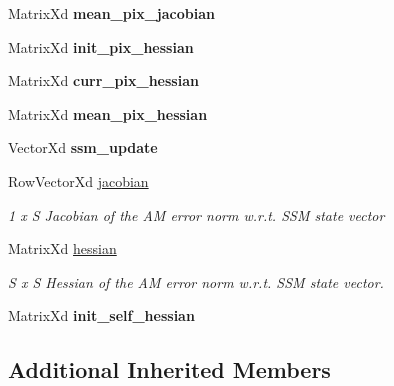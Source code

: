 \begin{DoxyCompactItemize}
\item 
\hypertarget{classESMH_a2d91cb739ee987432da7e95dea5b13ae}{Matrix\-Xd {\bfseries mean\-\_\-pix\-\_\-jacobian}}\label{classESMH_a2d91cb739ee987432da7e95dea5b13ae}

\item 
\hypertarget{classESMH_a4bb14113f170c065e182d84c6bfff9fe}{Matrix\-Xd {\bfseries init\-\_\-pix\-\_\-hessian}}\label{classESMH_a4bb14113f170c065e182d84c6bfff9fe}

\item 
\hypertarget{classESMH_a95468d74c34e74a5f229961f8d090502}{Matrix\-Xd {\bfseries curr\-\_\-pix\-\_\-hessian}}\label{classESMH_a95468d74c34e74a5f229961f8d090502}

\item 
\hypertarget{classESMH_a6e1297817fc28659c443e992255fd7d2}{Matrix\-Xd {\bfseries mean\-\_\-pix\-\_\-hessian}}\label{classESMH_a6e1297817fc28659c443e992255fd7d2}

\item 
\hypertarget{classESMH_a0ec68b4ff62ff30a318148dbbf1a605f}{Vector\-Xd {\bfseries ssm\-\_\-update}}\label{classESMH_a0ec68b4ff62ff30a318148dbbf1a605f}

\item 
\hypertarget{classESMH_a4eca65fbf26a66bdaba80c6de599aa82}{Row\-Vector\-Xd \hyperlink{classESMH_a4eca65fbf26a66bdaba80c6de599aa82}{jacobian}}\label{classESMH_a4eca65fbf26a66bdaba80c6de599aa82}

\begin{DoxyCompactList}\small\item\em 1 x S Jacobian of the A\-M error norm w.\-r.\-t. S\-S\-M state vector \end{DoxyCompactList}\item 
\hypertarget{classESMH_a3f378f0d6bc6f9a5704a92f1c822d5d6}{Matrix\-Xd \hyperlink{classESMH_a3f378f0d6bc6f9a5704a92f1c822d5d6}{hessian}}\label{classESMH_a3f378f0d6bc6f9a5704a92f1c822d5d6}

\begin{DoxyCompactList}\small\item\em S x S Hessian of the A\-M error norm w.\-r.\-t. S\-S\-M state vector. \end{DoxyCompactList}\item 
\hypertarget{classESMH_ab5ed5bf94eaca5895a1845aaee24fd7d}{Matrix\-Xd {\bfseries init\-\_\-self\-\_\-hessian}}\label{classESMH_ab5ed5bf94eaca5895a1845aaee24fd7d}

\end{DoxyCompactItemize}
\subsection*{Additional Inherited Members}


